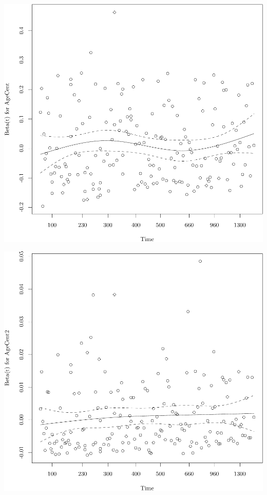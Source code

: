 \documentclass{article}\usepackage[]{graphicx}\usepackage[]{color}
\makeatletter
\def\maxwidth{ %
  \ifdim\Gin@nat@width>\linewidth
    \linewidth
  \else
    \Gin@nat@width
  \fi
}
\newenvironment{knitrout}{}{} %
\makeatother
\begin{document}
\begin{knitrout}
{}




{\centering \includegraphics[width=\maxwidth]{figure/05-eda-ph-check-full-2} 

}




{\centering \includegraphics[width=\maxwidth]{figure/05-eda-ph-check-full-3} 

}
\end{knitrout}
\end{document}
